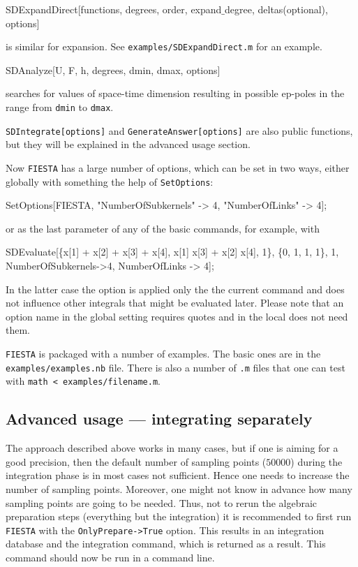 \documentclass[preprint,12pt]{elsarticle}
\newenvironment{code}
  {\tt\noindent\begin{framed}\begin{flushleft}}
  {\end{flushleft}\end{framed}\normalfont}
\begin{document}
\begin{code}
SDExpandDirect[functions, degrees, order, expand$\_$degree, deltas(optional), options]
\end{code}

\noindent is similar for expansion. See {\tt examples/SDExpandDirect.m} for an example.

\begin{code}
SDAnalyze[{U, F, h}, degrees, dmin, dmax, options]
\end{code}

\noindent searches for values of space-time dimension resulting in possible ep-poles in the range from {\tt dmin} to {\tt dmax}.

{\tt SDIntegrate[options]} and {\tt GenerateAnswer[options]} are also public functions, but they will be explained in the advanced usage section.

Now {\tt FIESTA} has a large number of options, which can be set in two ways, either globally with something the help of {\tt SetOptions}:

\begin{code}
SetOptions[FIESTA, "NumberOfSubkernels" -> 4, "NumberOfLinks" -> 4];
\end{code}

\noindent or as the last parameter of any of the basic commands, for example, with

\begin{code}
SDEvaluate[\{x[1] + x[2] + x[3] + x[4], x[1] x[3] + x[2] x[4], 1\}, \{0, 1, 1, 1\}, 1, NumberOfSubkernels->4, NumberOfLinks -> 4];
\end{code}

In the latter case the option is applied only the the current command and does not influence other integrals that might be evaluated later. Please note that an option name in the global setting requires quotes and in the local does not need them.

{\tt FIESTA} is packaged with a number of examples. The basic ones are in the {\tt examples/examples.nb} file. There is also a number of {\tt *.m} files that one can test with {\tt math < examples/filename.m}.

\subsection{Advanced usage --- integrating separately}

The approach described above works in many cases, but if one is aiming for a good precision, then the default number of sampling points ($50000$) during the integration phase is in most cases not sufficient. Hence one needs to increase the number of sampling points. Moreover, one might not know in advance how many sampling points are going to be needed. Thus, not to rerun the algebraic preparation steps (everything but the integration) it is recommended to first run {\tt FIESTA} with the {\tt OnlyPrepare->True} option. This results in an integration database and the integration command, which is returned as a result. This command should now be run in a command line.
\end{document}
